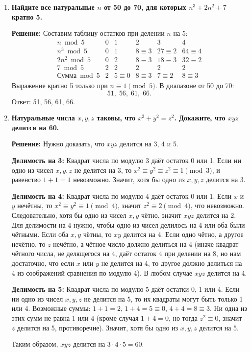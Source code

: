 \documentclass[12pt, a4paper]{article}
\begin{document}
\begin{enumerate}[label=\arabic*., wide=0pt, leftmargin=*]
\item \textbf{Найдите все натуральные \(n\) от 50 до 70, для которых \(n^3 + 2n^2 + 7\) кратно 5.}

\textbf{Решение:}
Составим таблицу остатков при делении \(n\) на 5:
\[
\begin{array}{c|ccccc}
n \bmod 5 & 0 & 1 & 2 & 3 & 4 \\
\hline
n^3 \bmod 5 & 0 & 1 & 8\equiv3 & 27\equiv2 & 64\equiv4 \\
2n^2 \bmod 5 & 0 & 2 & 8\equiv3 & 18\equiv3 & 32\equiv2 \\
7 \bmod 5 & 2 & 2 & 2 & 2 & 2 \\
\hline
\text{Сумма} \bmod 5 & 2 & 5\equiv0 & 8\equiv3 & 7\equiv2 & 8\equiv3
\end{array}
\]
Выражение кратно 5 только при \(n \equiv 1 \pmod{5}\). В диапазоне от 50 до 70:
\[
51,\;56,\;61,\;66.
\]
Ответ: 51, 56, 61, 66.

\item \textbf{Натуральные числа \(x, y, z\) таковы, что \(x^2 + y^2 = z^2\). Докажите, что \(xyz\) делится на 60.}

\textbf{Решение:}
Нужно доказать, что \(xyz\) делится на 3, 4 и 5.

\textbf{Делимость на 3:} 
Квадрат числа по модулю 3 даёт остаток 0 или 1. Если ни одно из чисел \(x, y, z\) не делится на 3, то \(x^2 \equiv y^2 \equiv z^2 \equiv 1 \pmod{3}\), и равенство \(1 + 1 = 1\) невозможно. Значит, хотя бы одно из \(x, y, z\) делится на 3.

\textbf{Делимость на 4:}
Квадрат числа по модулю 4 даёт остаток 0 или 1. Если \(x\) и \(y\) нечётны, то \(x^2 \equiv y^2 \equiv 1 \pmod{4}\), значит \(z^2 \equiv 2 \pmod{4}\), что невозможно. Следовательно, хотя бы одно из чисел \(x, y\) чётно, значит \(xyz\) делится на 2. Для делимости на 4 нужно, чтобы одно из чисел делилось на 4 или оба были чётными. Если оба \(x, y\) чётны, то \(xy\) делится на 4. Если одно чётно, а другое нечётно, то \(z\) нечётно, а чётное число должно делиться на 4 (иначе квадрат чётного числа, не делящегося на 4, даёт остаток 4 при делении на 8, но нам достаточно, что если \(x\) или \(y\) не делится на 4, то другое должно делиться на 4 из соображений сравнения по модулю 4). В любом случае \(xyz\) делится на 4.

\textbf{Делимость на 5:}
Квадрат числа по модулю 5 даёт остатки 0, 1 или 4. Если ни одно из чисел \(x, y, z\) не делится на 5, то их квадраты могут быть только 1 или 4. Возможные суммы: \(1+1=2\), \(1+4=5\equiv0\), \(4+4=8\equiv3\). Ни одна из этих сумм не равна 1 или 4 (кроме случая \(1+4=0\), но тогда \(z^2 \equiv 0\), значит \(z\) делится на 5, противоречие). Значит, хотя бы одно из \(x, y, z\) делится на 5.

Таким образом, \(xyz\) делится на \(3 \cdot 4 \cdot 5 = 60\).

\end{enumerate}
\end{document}
